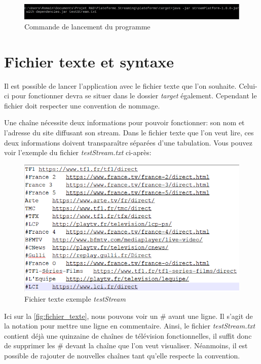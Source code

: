 \documentclass{polytech/polytech}
\begin{document}
\begin{figure}
	\includegraphics[scale=0.6]{images/cmdLancement.png}
	\caption{Commande de lancement du programme}
\end{figure}


\section{Fichier texte et syntaxe}

Il est possible de lancer l'application avec le fichier texte que l'on souhaite. Celui-ci pour fonctionner devra se situer dans le dossier \textit{target} également. Cependant le fichier doit respecter une convention de nommage. 


Une chaîne nécessite deux informations pour pouvoir fonctionner: son nom et l'adresse du site diffusant son stream. Dans le fichier texte que l'on veut lire, ces deux informations doivent transparaître séparées d'une tabulation. Vous pouvez voir l'exemple du fichier \textit{testStream.txt} ci-après:

\begin{figure}
	\includegraphics[scale=0.7]{images/textFile.png}
	\caption{Fichier texte exemple \textit{testStream}}
	\label{fig:fichier_texte}
\end{figure}

Ici sur la \autoref{fig:fichier_texte}, nous pouvons voir un \# avant une ligne. Il s'agit de la notation pour mettre une ligne en commentaire. Ainsi, le fichier \textit{testStream.txt} contient déjà une quinzaine de chaînes de télévision fonctionnelles, il suffit donc de supprimer les \# devant la chaîne que l'on veut visualiser. Néanmoins, il est possible de rajouter de nouvelles chaînes tant qu'elle respecte la convention. 
\end{document}
